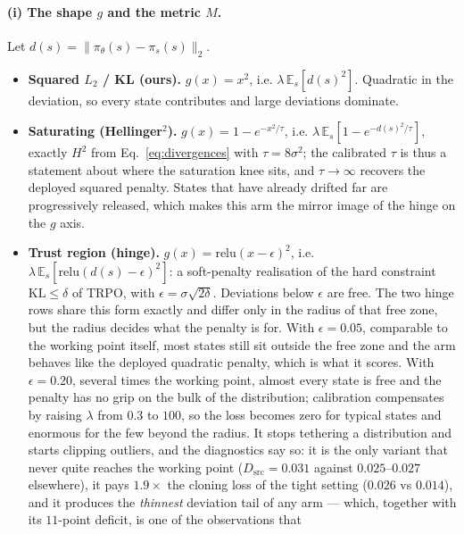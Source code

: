 \paragraph{(i) The shape $g$ and the metric $M$.}
Let $d(s) = \lVert \pi_\theta(s)-\pi_s(s)\rVert_2$.
\begin{itemize}\itemsep2pt
\item \textbf{Squared $L_2$ / KL (ours).} $g(x)=x^2$, i.e.
      $\lambda\,\mathbb{E}_s[d(s)^2]$. Quadratic in the deviation, so every
      state contributes and large deviations dominate.
\item \textbf{Saturating (Hellinger$^2$).}
      $g(x) = 1-e^{-x^2/\tau}$, i.e. $\lambda\,\mathbb{E}_s[1-e^{-d(s)^2/\tau}]$,
      exactly $H^2$ from Eq.~\ref{eq:divergences} with $\tau = 8\sigma^2$; the
      calibrated $\tau$ is thus a statement about where the saturation knee
      sits, and $\tau\to\infty$ recovers the deployed squared penalty. States
      that have already drifted far are progressively released, which makes
      this arm the mirror image of the hinge on the $g$ axis.
\item \textbf{Trust region (hinge).} $g(x) = \mathrm{relu}(x-\epsilon)^2$, i.e.
      $\lambda\,\mathbb{E}_s[\mathrm{relu}(d(s)-\epsilon)^2]$: a soft-penalty
      realisation of the hard constraint $\mathrm{KL}\le\delta$ of TRPO, with
      $\epsilon = \sigma\sqrt{2\delta}$. Deviations below $\epsilon$ are free.
      The two hinge rows share this form exactly and differ only in the radius
      of that free zone, but the radius decides what the penalty is for.
      With $\epsilon=0.05$, comparable to the working point itself, most states
      still sit outside the free zone and the arm behaves like the deployed
      quadratic penalty, which is what it scores. With $\epsilon=0.20$, several
      times the working point, almost every state is free and the penalty has
      no grip on the bulk of the distribution; calibration compensates by
      raising $\lambda$ from $0.3$ to $100$, so the loss becomes zero for
      typical states and enormous for the few beyond the radius. It stops
      tethering a distribution and starts clipping outliers, and the diagnostics
      say so: it is the only variant that never quite reaches the working point
      ($D_{\mathrm{src}}=0.031$ against $0.025$--$0.027$ elsewhere), it pays
      $1.9\times$ the cloning loss of the tight setting ($0.026$ vs $0.014$),
      and it produces the \emph{thinnest} deviation tail of any arm --- which,
      together with its $11$-point deficit, is one of the observations that

\end{itemize}
